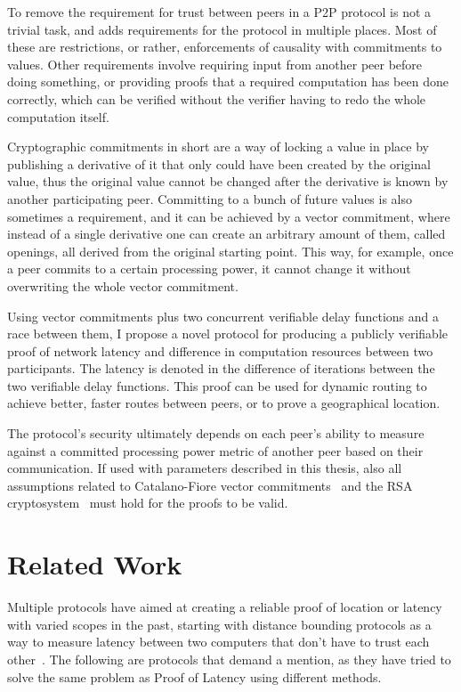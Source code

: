 To remove the requirement for trust between peers in a P2P protocol is not a trivial task, and adds requirements for the protocol in multiple places. Most of these are restrictions, or rather, enforcements of causality with commitments to values. Other requirements involve requiring input from another peer before doing something, or providing proofs that a required computation has been done correctly, which can be verified without the verifier having to redo the whole computation itself.

Cryptographic commitments in short are a way of locking a value in place by publishing a derivative of it that only could have been created by the original value, thus the original value cannot be changed after the derivative is known by another participating peer. Committing to a bunch of future values is also sometimes a requirement, and it can be achieved by a vector commitment, where instead of a single derivative one can create an arbitrary amount of them, called openings, all derived from the original starting point. This way, for example, once a peer commits to a certain processing power, it cannot change it without overwriting the whole vector commitment.

Using vector commitments plus two concurrent verifiable delay functions and a race between them, I propose a novel protocol for producing a publicly verifiable proof of network latency and difference in computation resources between two participants. The latency is denoted in the difference of iterations between the two verifiable delay functions. This proof can be used for dynamic routing to achieve better, faster routes between peers, or to prove a geographical location.

The protocol's security ultimately depends on each peer's ability to measure against a committed processing power metric of another peer based on their communication. If used with parameters described in this thesis, also all assumptions related to Catalano-Fiore vector commitments~\cite{Catalano2013-jn} and the RSA cryptosystem~\cite{Rivest1978-fm} must hold for the proofs to be valid.

\section{Related Work}
Multiple protocols have aimed at creating a reliable proof of location or latency with varied scopes in the past, starting with distance bounding protocols as a way to measure latency between two computers that don't have to trust each other~\cite{Brands1994-hz}. The following are protocols that demand a mention, as they have tried to solve the same problem as Proof of Latency using different methods.

